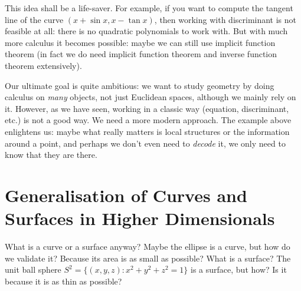 \documentclass[twoside]{article}
\begin{document}
		This idea shall be a life-saver. For example, if you want to compute the tangent line of the curve $(x+\sin{x},x-\tan{x})$, then working with discriminant is not feasible at all: there is no quadratic polynomials to work with. But with much more calculus it becomes possible: maybe we can still use implicit function theorem (in fact we do need implicit function theorem and inverse function theorem extensively). 
		
		Our ultimate goal is quite ambitious: we want to study geometry by doing calculus on \textit{many} objects, not just Euclidean spaces, although we mainly rely on it. However, as we have seen, working in a classic way (equation, discriminant, etc.) is not a good way. We need a more modern approach. The example above enlightens us: maybe what really matters is local structures or the information around a point, and perhaps we don't even need to \textit{decode} it, we only need to know that they are there.
		
		\section{Generalisation of Curves and Surfaces in Higher Dimensionals}
		What is a curve or a surface anyway? Maybe the ellipse is a curve, but how do we validate it? Because its area is as small as possible? What is a surface? The unit ball sphere $S^2=\{(x,y,z):x^2+y^2+z^2=1\}$ is a surface, but how? Is it because it is as thin as possible?
		
\end{document}

